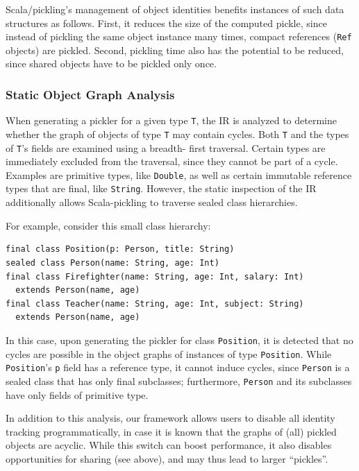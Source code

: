 \documentclass[10pt]{sigplanconf}
\theoremstyle{definition}
\theoremstyle{definition}
\begin{document}
Scala/pickling's management of object identities benefits instances of such
data structures as follows. First, it reduces the size of the computed pickle,
since instead of pickling the same object instance many times, compact
references (\verb|Ref| objects) are pickled. Second, pickling time also has
the potential to be reduced, since shared objects have to be pickled only
once.

\subsubsection{Static Object Graph Analysis}
\label{sec:object-graph-analysis}

When generating a pickler for a given type \verb|T|, the IR is analyzed to
determine whether the graph of objects of type \verb|T| may contain cycles.
Both \verb|T| and the types of \verb|T|'s fields are examined using a breadth-
first traversal. Certain types are immediately excluded from the traversal,
since they cannot be part of a cycle. Examples are primitive types, like
\verb|Double|, as well as certain immutable reference types that are final,
like \verb|String|. However, the static inspection of the IR additionally
allows Scala-pickling to traverse sealed class hierarchies.

For example, consider this small class hierarchy:

\begin{lstlisting}
final class Position(p: Person, title: String)
sealed class Person(name: String, age: Int)
final class Firefighter(name: String, age: Int, salary: Int)
  extends Person(name, age)
final class Teacher(name: String, age: Int, subject: String)
  extends Person(name, age)
\end{lstlisting}

In this case, upon generating the pickler for class \verb|Position|, it is
detected that no cycles are possible in the object graphs of instances of type
\verb|Position|. While \verb|Position|'s \verb|p| field has a reference type,
it cannot induce cycles, since \verb|Person| is a sealed class that has only
final subclasses; furthermore, \verb|Person| and its subclasses have only
fields of primitive type.

In addition to this analysis, our framework allows users to disable all
identity tracking programmatically, in case it is known that the graphs of
(all) pickled objects are acyclic. While this switch can boost performance, it
also disables opportunities for sharing (see above), and may thus lead to
larger ``pickles''.
\end{document}
